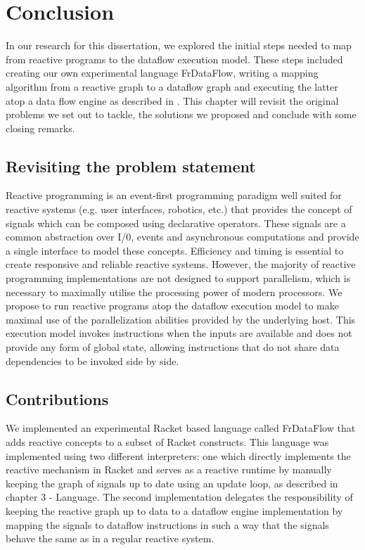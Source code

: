 \chapter{Conclusion}

In our research for this dissertation, we explored the initial steps needed to map from reactive programs to the dataflow execution model. 
These steps included creating our own experimental language FrDataFlow, writing a mapping algorithm from a reactive graph to a dataflow graph and executing the latter atop a data flow engine as described in \cite{saey_extensible_2017}. This chapter will revisit the original problems we set out to tackle, the solutions we proposed and conclude with some closing remarks. 

\newpage
\section{Revisiting the problem statement}

Reactive programming is an event-first programming paradigm well suited for reactive systems (e.g. user interfaces, robotics, etc.) that provides the concept of signals which can be composed using declarative operators.
These signals are a common abstraction over I/0, events and asynchronous computations and provide a single interface to model these concepts.
Efficiency and timing is essential to create responsive and reliable reactive systems. However, the majority of reactive programming implementations are not designed to support parallelism, which is necessary to maximally utilise the processing power of modern processors. We propose to run reactive programs atop the dataflow execution model to make maximal use of the parallelization abilities provided by the underlying host. This execution model invokes instructions when the inputs are available and does not provide any form of global state, allowing instructions that do not share data dependencies to be invoked side by side. 

\newpage
\section{Contributions}

We implemented an experimental Racket based language called FrDataFlow that adds reactive concepts to a subset of Racket constructs. This language was implemented using two different interpreters: one which directly implements the reactive mechanism in Racket and serves as a reactive runtime by manually keeping the graph of signals up to date using an update loop, as described in chapter 3 - Language.
The second implementation delegates the responsibility of keeping the reactive graph up to data to a dataflow engine implementation by mapping the signals to dataflow instructions in such a way that the signals behave the same as in a regular reactive system. 

